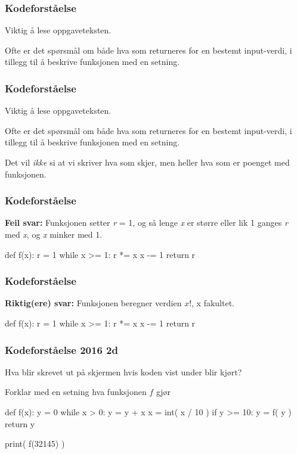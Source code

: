 
\begin{frame}
    \frametitle{Kodeforståelse}

    Viktig å lese oppgaveteksten. 
    
    Ofte er det spørsmål om både hva som returneres for en bestemt input-verdi, i tillegg til å beskrive funksjonen med en setning. 

\end{frame}


\begin{frame}
    \frametitle{Kodeforståelse}

    Viktig å lese oppgaveteksten. 
    
    Ofte er det spørsmål om både hva som returneres for en bestemt input-verdi, i tillegg til å beskrive funksjonen med en setning. 

    Det vil \textit{ikke} si at vi skriver hva som skjer, men heller hva som er poenget med funksjonen. 

\end{frame}

\begin{frame}[fragile]
    \frametitle{Kodeforståelse}

    \textbf{Feil svar:} Funksjonen setter \textit{r} = 1, og så lenge \textit{x} er større eller lik 1 ganges \textit{r} med \textit{x}, og \textit{x} minker med 1. 

\begin{python}
def f(x): 
    r = 1
    while x >= 1: 
        r *= x
        x -= 1
    return r
\end{python}

\end{frame}

\begin{frame}[fragile]
    \frametitle{Kodeforståelse}

    \textbf{Riktig(ere) svar:} Funksjonen beregner verdien $x!$, x fakultet.

\begin{python}
def f(x): 
    r = 1
    while x >= 1: 
        r *= x
        x -= 1
    return r
\end{python}

\end{frame}

\begin{frame}[fragile]
    \frametitle{Kodeforståelse 2016 2d}

    Hva blir skrevet ut på skjermen hvis koden vist under blir kjørt? 

    Forklar med en setning hva funksjonen $f$ gjør

\begin{python}
def f(x):
    y = 0
    while x > 0:
        y = y + x %
        x = int( x / 10 )
    if y >= 10:
        y = f( y )
    return y

print( f(32145) )
\end{python}

\end{frame}

